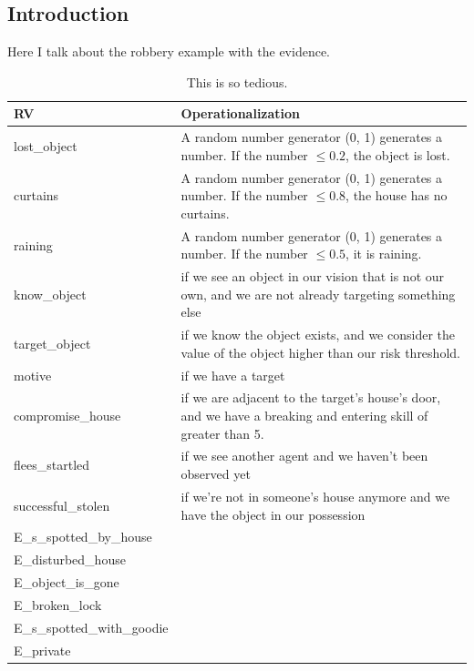 \subsection{Introduction}
Here I talk about the robbery example with the evidence.



\begin{table}
\tiny
\begin{tabular}{|l|l|}
 \hline
 RV &Operationalization\\
 \hline
lost\_object   & A random number generator (0, 1) generates a number. If the number $\leq 0.2$, the object is lost.\\
curtains & A random number generator (0, 1) generates a number. If the number $\leq 0.8$, the house has no curtains.  \\
raining & A random number generator (0, 1) generates a number. If the number $\leq 0.5$, it is raining.   \\
know\_object & if we see an object in our vision that is not our own, and we are not already targeting something else  \\
target\_object & if we know the object exists, and we consider the value of the object higher than our risk threshold.  \\
motive & if we have a target \\
compromise\_house & if we are adjacent to the target's house's door, and we have a breaking and entering skill of greater than 5. \\
flees\_startled & if we see another agent and we haven't been observed yet  \\
successful\_stolen & if we're not in someone's house anymore and we have the object in our possession \\ 
E\_s\_spotted\_by\_house&   \\ 
E\_disturbed\_house&   \\ 
E\_object\_is\_gone&   \\ 
E\_broken\_lock&   \\ 
E\_s\_spotted\_with\_goodie&   \\ 
E\_private&   \\ 

\hline
\end{tabular}
\caption{This is so tedious.}
\end{table}




